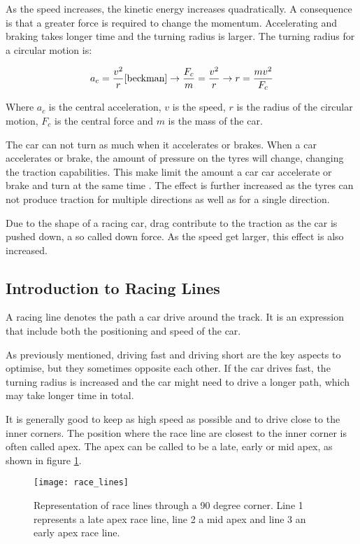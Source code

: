 As the speed increases, the kinetic energy increases quadratically. A consequence is that a greater force is required to change the momentum. Accelerating and braking takes longer time and the turning radius is larger. The turning radius for a circular motion is:

\begin{equation}
a_c = \frac{v^2}{r} \cite{beckman} 
\rightarrow
\frac{F_c}{m} = \frac{v^2}{r} 
\rightarrow
r = \frac{mv^2}{F_c}
\end{equation}

Where $a_c$ is the central acceleration, $v$ is the speed, $r$ is the radius of the circular motion, $F_c$ is the central force and $m$ is the mass of the car.

The car can not turn as much when it accelerates or brakes. When a car accelerates or brake, the amount of pressure on the tyres will change, changing the traction capabilities. This make limit the amount a car car accelerate or brake and turn at the same time \cite{beckman}. The effect is further increased as the tyres can not produce traction for multiple directions as well as for a single direction\cite{beckman}. 

Due to the shape of a racing car, drag contribute to the traction as the car is pushed down, a so called down force. As the speed get larger, this effect is also increased.

\subsection{Introduction to Racing Lines}
A racing line denotes the path a car drive around the track. It is an expression that include both the positioning and speed of the car.

As previously mentioned, driving fast and driving short are the key aspects to optimise, but they sometimes opposite each other. If the car drives fast, the turning radius is increased and the car might need to drive a longer path, which may take longer time in total. 

It is generally good to keep as high speed as possible and to drive close to the inner corners. The position where the race line are closest to the inner corner is often called apex. The apex can be called to be a late, early or mid apex, as shown in figure \ref{figure:apex_variants}.

\begin{figure}[H]
    \centering
    \texttt{[image: race\_lines]}
    \caption{Representation of race lines through a 90 degree corner. Line 1 represents a late apex race line, line 2 a mid apex and line 3 an early apex race line.}
    \label{figure:apex_variants}
\end{figure}

